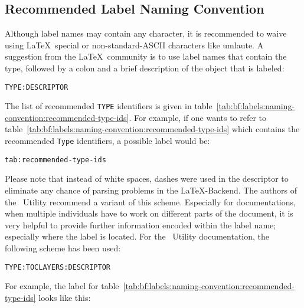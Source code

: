 	
	\newpage
	\subsection{Recommended Label Naming Convention}
		Although label names may contain any character, it is recommended to waive using \LaTeX~special or non-standard-ASCII characters like umlaute.
		\newline A suggestion from the \LaTeX~community is to use label names that contain the type, followed by a colon and a brief description of the object that is labeled:\\[-1cm]		
		\begin{center}
			\lstinline$TYPE:DESCRIPTOR$
		\end{center}
		\vspace{-0.5cm}
		The list of recommended \lstinline$TYPE$ identifiers is given in \mbox{table \ref{tab:bf:labels:naming-convention:recommended-type-ids}}.
		For example, if one wants to refer to \mbox{table \ref{tab:bf:labels:naming-convention:recommended-type-ids}} which contains the recommended \lstinline$Type$ identifiers, a possible label would be:\\[-1cm]		
		\begin{center}
			\lstinline$tab:recommended-type-ids$
		\end{center} 
		\vspace{-0.325cm}
		Please note that instead of white spaces, dashes were used in the descriptor to eliminate any chance of parsing problems in the \LaTeX-Backend.
		\newline The authors of the \productName~Utility recommend a variant of this scheme. Especially for documentations, when multiple individuals have to work on different parts of the document, it is very helpful to provide further information encoded within the label name; especially where the label is located. For the \productName~Utility documentation, the following scheme has been used:\\[-1cm]		
		\begin{center}
			\lstinline$TYPE:TOCLAYERS:DESCRIPTOR$
		\end{center} 
		\vspace{-0.25cm}
		For example, the label for \mbox{table \ref{tab:bf:labels:naming-convention:recommended-type-ids}} looks like this:\\[-1cm]		
